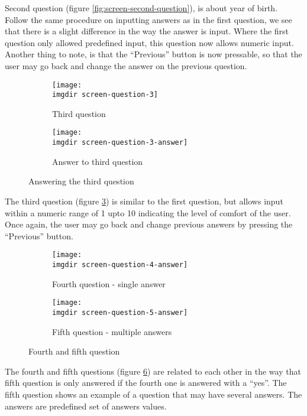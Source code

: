 Second question (figure \ref{fig:screen-second-question}), is about year of birth. Follow the same procedure on inputting answers as in the first question, we see that there is a slight difference in the way the answer is input. Where the first question only allowed predefined input, this question now allows numeric input. Another thing to note, is that the ``Previous'' button is now pressable, so that the user may go back and change the answer on the previous question.
\newpage

\begin{figure}[!htbp]
  \centering
  \begin{subfigure}{.3\textwidth}
    \centering
    \texttt{[image: \\imgdir screen-question-3]}
    \caption{Third question}
    \label{fig:screen-question-3}
  \end{subfigure}
  \begin{subfigure}{.3\textwidth}
    \centering
    \texttt{[image: \\imgdir screen-question-3-answer]}
    \caption{Answer to third question}
    \label{fig:screen-question-3-answer}
  \end{subfigure}
  \caption{Answering the third question}
  \label{fig:screen-third-question}
\end{figure}

The third question (figure \ref{fig:screen-third-question}) is similar to the first question, but allows input within a numeric range of 1 upto 10 indicating the level of comfort of the user. Once again, the user may go back and change previous answers by pressing the ``Previous'' button.
\newpage

\begin{figure}[!htbp]
  \centering
  \begin{subfigure}{.3\textwidth}
    \centering
    \texttt{[image: \\imgdir screen-question-4-answer]}
    \caption{Fourth question - single answer}
    \label{fig:screen-question-4-answer}
  \end{subfigure}
  \begin{subfigure}{.3\textwidth}
    \centering
    \texttt{[image: \\imgdir screen-question-5-answer]}
    \caption{Fifth question - multiple answers}
    \label{fig:screen-question-5-answer}
  \end{subfigure}
  \caption{Fourth and fifth question}
  \label{fig:screen-fourth-and-fifth-question}
\end{figure}

The fourth and fifth questions (figure \ref{fig:screen-fourth-and-fifth-question}) are related to each other in the way that fifth question is only answered if the fourth one is answered with a ``yes''. The fifth question shows an example of a question that may have several answers. The answers are predefined set of answers values.
\newpage

